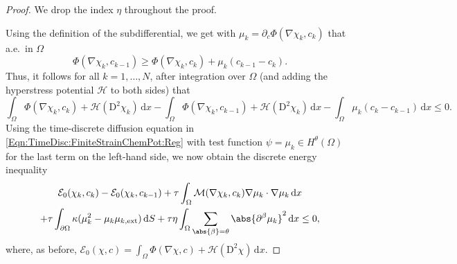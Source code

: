 \documentclass[a4paper,12pt]{article}
\newcommand{\ext}{\mathrm{ext}}
\newcommand{\calM}{\mathcal{M}}
\newcommand{\pl}{\partial}
\newcommand{\dx}{\mathrm{\,d}x}
\newcommand{\dd}{\mathrm{\,d}}
\newcommand{\dS}{\mathrm{\,d}S}
\newcommand{\calE}{\mathcal{E}}
\newcommand{\rmD}{\mathrm{D}}
\theoremstyle{plain}
\theoremstyle{definition}
\numberwithin{equation}{section}
\begin{document}
\begin{proof}
    We drop the index $\eta$ throughout the proof.
    
Using the definition of the subdifferential, we get with $\mu_k = \pl_c\Phi(\nabla\chi_k,c_k)$ that a.e.\ in $\Omega$
\[
	\Phi(\nabla\chi_k,c_{k-1})\geq \Phi(\nabla\chi_k,c_k)+\mu_k(c_{k-1}-c_k). %
\] 
Thus, it follows for all $k=1,\ldots,N$, 
after integration over $\Omega$ 
(and adding the hyperstress potential 
$\mathscr{H}$ to both sides) that
\begin{equation*}
\int_\Omega \Phi(\nabla\chi_k,c_k)
+\mathscr{H}(\rmD^2\chi_k)\dx 
- \int_\Omega \Phi(\nabla\chi_k,c_{k-1})+\mathscr{H}(\rmD^2\chi_k)\dx -\int_\Omega \mu_k(c_k {-} c_{k-1})\dx 	\leq 0.
\end{equation*} 
Using the time-discrete diffusion equation in
\eqref{Eqn:TimeDisc:FiniteStrainChemPot:Reg} 
with test function $\psi = \mu_k\in H^\theta(\Omega)$ for the
last term on the left-hand side, we now obtain the discrete
energy inequality
\begin{multline}
    \label{Eqn:TimeDisc:CalcAPriori1}
			\mathcal{E}_0(\chi_k,c_k) - \mathcal{E}_0(\chi_k,c_{k-1}) +\tau\int_\Omega \calM(\nabla\chi_k,c_k)\nabla\mu_k\cdot\nabla\mu_k\dx 
			\\+ \tau\int_{\pl\Omega}\kappa(\mu_k^2 - \mu_k\mu_{k,\ext})\dS + \tau\eta\int_\Omega\sum_{\abs{\beta}=\theta}\abs{\pl^\beta\mu_k}^2\dd x %
			\leq 0,
\end{multline}
where, as before, $\calE_0(\chi,c)=\int_\Omega \Phi(\nabla\chi,c)+\mathscr{H}(\rmD^2 \chi)\dd x$.


\end{proof}
\end{document}
